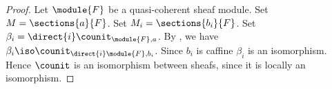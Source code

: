 
\begin{proof}
Let $\module{F}$ be a quasi-coherent sheaf module. 
Set $M = \sections{a}{F}$.
Set $M_i = \sections{b_i}{F}$.
Set $\beta_i = \direct{i}\counit_{\module{F},a}$.
By , we have$\beta_i \iso \counit_{\direct{i}\module{F},b_i}$.
Since $b_i$ is caffine $\beta_i$ is an isomorphism.
Hence $\counit$ is an isomorphism between sheafs, since it is locally an isomorphism.
\end{proof}